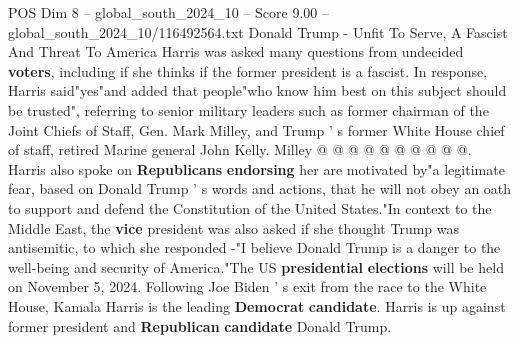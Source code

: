 \begin{textsample}{POS Dim 8 – global\_south\_2024\_10 – Score 9.00 – global\_south\_2024\_10/116492564.txt}
Donald Trump - Unfit To Serve, A Fascist And Threat To America Harris was asked many questions from undecided \textbf{voters}, including if she thinks if the former president is a fascist.
In response, Harris said"yes"and added that people"who know him best on this subject should be trusted", referring to senior military leaders such as former chairman of the Joint Chiefs of Staff, Gen.
Mark Milley, and Trump ' s former White House chief of staff, retired Marine general John Kelly.
Milley @ @ @ @ @ @ @ @ @ @.
Harris also spoke on \textbf{Republicans} \textbf{endorsing} her are motivated by"a legitimate fear, based on Donald Trump ' s words and actions, that he will not obey an oath to support and defend the Constitution of the United States."In context to the Middle East, the \textbf{vice} president was also asked if she thought Trump was antisemitic, to which she responded -"I believe Donald Trump is a danger to the well-being and security of America."The US \textbf{presidential} \textbf{elections} will be held on November 5, 2024.
Following Joe Biden ' s exit from the race to the White House, Kamala Harris is the leading \textbf{Democrat} \textbf{candidate}.
Harris is up against former president and \textbf{Republican} \textbf{candidate} Donald Trump.

\end{textsample}
